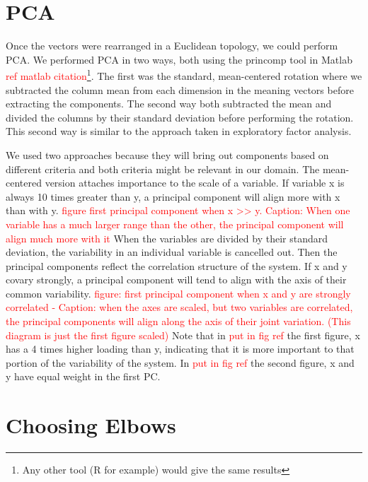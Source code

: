 \documentclass[10pt,letterpaper]{book}
\newcommand{\todo}[1]{\textcolor{red}{#1}}
\begin{document}
\section{PCA}

Once the vectors were rearranged in a Euclidean topology, we could perform PCA. We performed PCA in two ways, both using the princomp tool in Matlab \todo{ref matlab citation}\footnote{Any other tool (R for example) would give the same results}. The first was the standard, mean-centered rotation where we subtracted the column mean from each dimension in the meaning vectors before extracting the components. The second way both subtracted the mean and divided the columns by their standard deviation before performing the rotation. This second way is similar to the approach taken in exploratory factor analysis. 

We used two approaches because they will bring out components based on different criteria and both criteria might be relevant in our domain. The mean-centered version attaches importance to the scale of a variable. If variable x is always 10 times greater than y, a principal component will align more with x than with y. \todo{figure first principal component when x >> y. Caption: When one variable has a much larger range than the other, the principal component will align much more with it} When the variables are divided by their standard deviation, the variability in an individual variable is cancelled out. Then the principal components reflect the correlation structure of the system. If x and y covary strongly, a principal component will tend to align with the axis of their common variability.  \todo{figure: first principal component when x and y are strongly correlated - Caption: when the axes are scaled, but two variables are correlated, the principal components will align along the axis of their joint variation. (This diagram is just the first figure scaled)} Note that in \todo{put in fig ref} the first figure, x has a 4 times higher loading than y, indicating that it is more important to that portion of the variability of the system. In \todo{put in fig ref} the second figure, x and y have equal weight in the first PC.

\section{Choosing Elbows}
\end{document}
